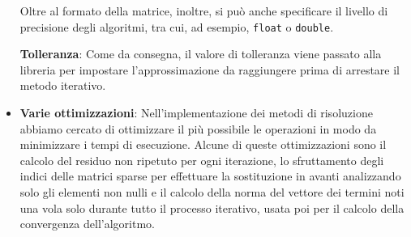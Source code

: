 \begin{itemize}
\begin{item}
		Oltre al formato della matrice, inoltre, si può anche specificare il livello di precisione degli algoritmi, tra cui, ad esempio, \texttt{float} o \texttt{double}.
	\end{item}
	\begin{item}
		\textbf{Tolleranza}: Come da consegna, il valore di tolleranza viene passato alla libreria per impostare l'approssimazione da raggiungere prima di arrestare il metodo iterativo.
	\end{item}
	\item \textbf{Varie ottimizzazioni}: Nell'implementazione dei metodi di risoluzione abbiamo cercato di ottimizzare il più possibile le operazioni in modo da minimizzare i tempi di esecuzione. Alcune di queste ottimizzazioni sono il calcolo del residuo non ripetuto per ogni iterazione, lo sfruttamento degli indici delle matrici sparse per effettuare la sostituzione in avanti analizzando solo gli elementi non nulli e il calcolo della norma del vettore dei termini noti una vola solo durante tutto il processo iterativo, usata poi per il calcolo della convergenza dell'algoritmo.

\end{itemize}